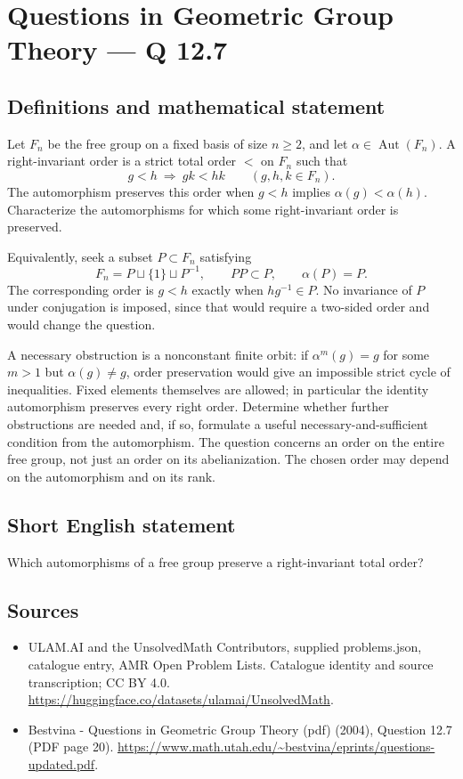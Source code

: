 \documentclass[11pt,a4paper]{article}
\begin{document}
\section*{Questions in Geometric Group Theory — Q 12.7}\label{statement}

\subsection{Definitions and mathematical statement}
Let $F_n$ be the free group on a fixed basis of size $n\geq2$, and let $\alpha\in\operatorname{Aut}(F_n)$. A right-invariant order is a strict total order $<$ on $F_n$ such that
\[
 g<h\ \Longrightarrow\ gk<hk\qquad(g,h,k\in F_n).
\]
The automorphism preserves this order when $g<h$ implies $\alpha(g)<\alpha(h)$. Characterize the automorphisms for which some right-invariant order is preserved.

Equivalently, seek a subset $P\subset F_n$ satisfying
\[
 F_n=P\sqcup\{1\}\sqcup P^{-1},\qquad PP\subset P,
 \qquad\alpha(P)=P.
\]
The corresponding order is $g<h$ exactly when $hg^{-1}\in P$. No invariance of $P$ under conjugation is imposed, since that would require a two-sided order and would change the question.

A necessary obstruction is a nonconstant finite orbit: if $\alpha^m(g)=g$ for some $m>1$ but $\alpha(g)\ne g$, order preservation would give an impossible strict cycle of inequalities. Fixed elements themselves are allowed; in particular the identity automorphism preserves every right order. Determine whether further obstructions are needed and, if so, formulate a useful necessary-and-sufficient condition from the automorphism. The question concerns an order on the entire free group, not just an order on its abelianization. The chosen order may depend on the automorphism and on its rank.
\subsection{Short English statement}
Which automorphisms of a free group preserve a right-invariant total order?
\subsection{Sources}
\begin{itemize}
\item[S1] ULAM.AI and the UnsolvedMath Contributors, supplied problems.json, catalogue entry, AMR Open Problem Lists. Catalogue identity and source transcription; CC BY 4.0.
\url{https://huggingface.co/datasets/ulamai/UnsolvedMath}.
\item[S2] Bestvina - Questions in Geometric Group Theory (pdf) (2004), Question 12.7 (PDF page 20). 
\url{https://www.math.utah.edu/~bestvina/eprints/questions-updated.pdf}.
\end{itemize}
\end{document}

